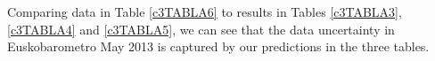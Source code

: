 Comparing data in Table \ref{c3TABLA6} to results in Tables \ref{c3TABLA3}, \ref{c3TABLA4} and \ref{c3TABLA5}, we can see that the data uncertainty in Euskobarometro May 2013 is captured by our predictions in the three tables.

%
%
